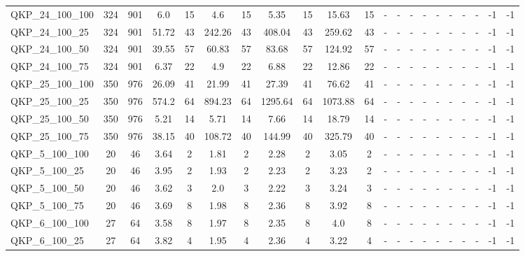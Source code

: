 \begin{sidewaystable}[!ht]
{\begin{tabular}{lcccccccccccccccccccc}
QKP\_24\_100\_100 & 324 & 901 & 6.0 & 15 &  \textcolor{blue2}{4.6} & 15 & 5.35 & 15 & 15.63 & 15 &  - &  - &  - &  - &  - &  - &  - &  - & -1 & -1 \\
QKP\_24\_100\_25 & 324 & 901 &  \textcolor{blue2}{51.72} & 43 & 242.26 & 43 & 408.04 & 43 & 259.62 & 43 &  - &  - &  - &  - &  - &  - &  - &  - & -1 & -1 \\
QKP\_24\_100\_50 & 324 & 901 &  \textcolor{blue2}{39.55} & 57 & 60.83 & 57 & 83.68 & 57 & 124.92 & 57 &  - &  - &  - &  - &  - &  - &  - &  - & -1 & -1 \\
QKP\_24\_100\_75 & 324 & 901 & 6.37 & 22 &  \textcolor{blue2}{4.9} & 22 & 6.88 & 22 & 12.86 & 22 &  - &  - &  - &  - &  - &  - &  - &  - & -1 & -1 \\
QKP\_25\_100\_100 & 350 & 976 & 26.09 & 41 &  \textcolor{blue2}{21.99} & 41 & 27.39 & 41 & 76.62 & 41 &  - &  - &  - &  - &  - &  - &  - &  - & -1 & -1 \\
QKP\_25\_100\_25 & 350 & 976 &  \textcolor{blue2}{574.2} & 64 & 894.23 & 64 & 1295.64 & 64 & 1073.88 & 64 &  - &  - &  - &  - &  - &  - &  - &  - & -1 & -1 \\
QKP\_25\_100\_50 & 350 & 976 &  \textcolor{blue2}{5.21} & 14 & 5.71 & 14 & 7.66 & 14 & 18.79 & 14 &  - &  - &  - &  - &  - &  - &  - &  - & -1 & -1 \\
QKP\_25\_100\_75 & 350 & 976 &  \textcolor{blue2}{38.15} & 40 & 108.72 & 40 & 144.99 & 40 & 325.79 & 40 &  - &  - &  - &  - &  - &  - &  - &  - & -1 & -1 \\
QKP\_5\_100\_100 & 20 & 46 & 3.64 & 2 &  \textcolor{blue2}{1.81} & 2 & 2.28 & 2 & 3.05 & 2 &  - &  - &  - &  - &  - &  - &  - &  - & -1 & -1 \\
QKP\_5\_100\_25 & 20 & 46 & 3.95 & 2 &  \textcolor{blue2}{1.93} & 2 & 2.23 & 2 & 3.23 & 2 &  - &  - &  - &  - &  - &  - &  - &  - & -1 & -1 \\
QKP\_5\_100\_50 & 20 & 46 & 3.62 & 3 &  \textcolor{blue2}{2.0} & 3 & 2.22 & 3 & 3.24 & 3 &  - &  - &  - &  - &  - &  - &  - &  - & -1 & -1 \\
QKP\_5\_100\_75 & 20 & 46 & 3.69 & 8 &  \textcolor{blue2}{1.98} & 8 & 2.36 & 8 & 3.92 & 8 &  - &  - &  - &  - &  - &  - &  - &  - & -1 & -1 \\
QKP\_6\_100\_100 & 27 & 64 & 3.58 & 8 &  \textcolor{blue2}{1.97} & 8 & 2.35 & 8 & 4.0 & 8 &  - &  - &  - &  - &  - &  - &  - &  - & -1 & -1 \\
QKP\_6\_100\_25 & 27 & 64 & 3.82 & 4 &  \textcolor{blue2}{1.95} & 4 & 2.36 & 4 & 3.22 & 4 &  - &  - &  - &  - &  - &  - &  - &  - & -1 & -1 \\

\end{tabular}}
\end{sidewaystable}
